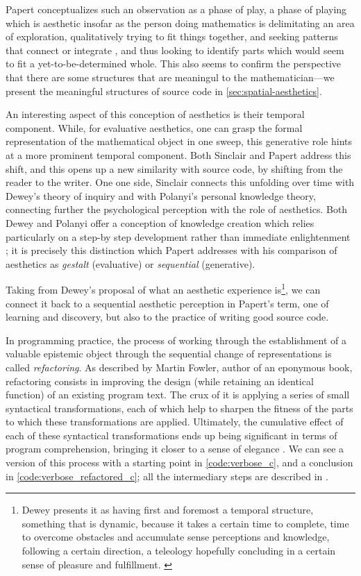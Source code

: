 Papert conceptualizes such an observation as a phase of play, a phase of playing which is aesthetic insofar as the person doing mathematics is delimitating an area of exploration, qualitatively trying to fit things together, and seeking patterns that connect or integrate \citep{papert_mathematical_1978}, and thus looking to identify parts which would seem to fit a yet-to-be-determined whole. This also seems to confirm the perspective that there are some structures that are meaningul to the mathematician—we present the meaningful structures of source code in \ref{sec:spatial-aesthetics}.

An interesting aspect of this conception of aesthetics is their temporal component. While, for evaluative aesthetics, one can grasp the formal representation of the mathematical object in one sweep, this generative role hints at a more prominent temporal component. Both Sinclair and Papert address this shift, and this opens up a new similarity with source code, by shifting from the reader to the writer. One one side, Sinclair connects this unfolding over time with Dewey's theory of inquiry and with Polanyi's personal knowledge theory, connecting further the psychological perception with the role of aesthetics. Both Dewey and Polanyi offer a conception of knowledge creation which relies particularly on a step-by step development rather than immediate enlightenment \citep{polanyi_knowing_1969,sinclair_roles_2004}; it is precisely this distinction which Papert addresses with his comparison of aesthetics as \emph{gestalt} (evaluative) or \emph{sequential} (generative).

Taking from Dewey's proposal of what an aesthetic experience is\footnote{Dewey presents it as having first and foremost a temporal structure, something that is dynamic, because it takes a certain time to complete, time to overcome obstacles and accumulate sense perceptions and knowledge, following a certain direction, a teleology hopefully concluding in a certain sense of pleasure and fulfillment. \citep{leddy_dewey_2021}}, we can connect it back to a sequential aesthetic perception in Papert's term, one of learning and discovery, but also to the practice of writing good source code.

In programming practice, the process of working through the establishment of a valuable epistemic object through the sequential change of representations is called \emph{refactoring}. As described by Martin Fowler, author of an eponymous book, refactoring consists in improving the design (while retaining an identical function) of an existing program text. The crux of it is applying a series of small syntactical transformations, each of which help to sharpen the fitness of the parts to which these transformations are applied. Ultimately, the cumulative effect of each of these syntactical transformations ends up being significant in terms of program comprehension, bringing it closer to a sense of elegance \citep{fowler_refactoring_1999}. We can see a version of this process with a starting point in \ref{code:verbose_c}, and a conclusion in \ref{code:verbose_refactored_c}; all the intermediary steps are described in \citep{muratori_semantic_2014}.

